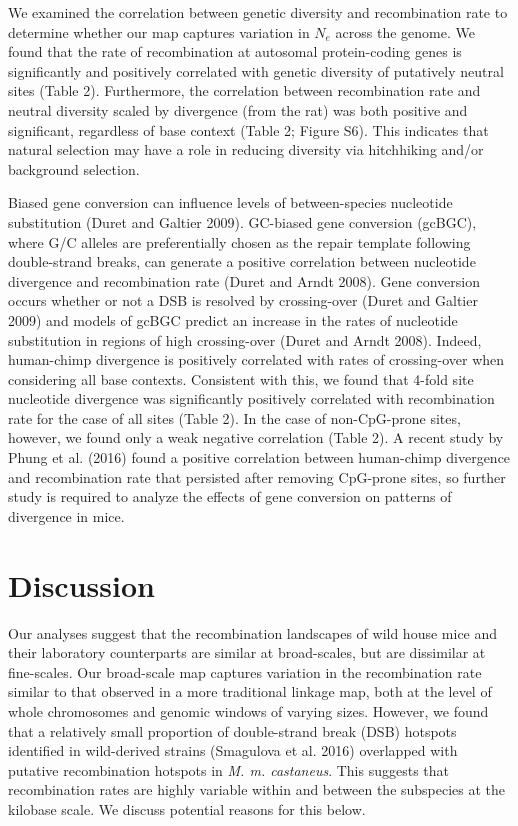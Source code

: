 	We examined the correlation between genetic diversity and recombination rate to determine whether our map captures variation in $N_e$ across the genome. We found that the rate of recombination at autosomal protein-coding genes is significantly and positively correlated with genetic diversity of putatively neutral sites (Table 2). Furthermore, the correlation between recombination rate and neutral diversity scaled by divergence (from the rat) was both positive and significant, regardless of base context (Table 2; Figure S6). This indicates that natural selection may have a role in reducing diversity via hitchhiking and/or background selection.

	Biased gene conversion can influence levels of between-species nucleotide substitution (Duret and Galtier 2009). GC-biased gene conversion (gcBGC), where G/C alleles are preferentially chosen as the repair template following double-strand breaks, can generate a positive correlation between nucleotide divergence and recombination rate (Duret and Arndt 2008). Gene conversion occurs whether or not a DSB is resolved by crossing-over (Duret and Galtier 2009) and models of gcBGC predict an increase in the rates of nucleotide substitution in regions of high crossing-over (Duret and Arndt 2008). Indeed, human-chimp divergence is positively correlated with rates of crossing-over when considering all base contexts. Consistent with this, we found that 4-fold site nucleotide divergence was significantly positively correlated with recombination rate for the case of all sites (Table 2). In the case of non-CpG-prone sites, however, we found only a weak negative correlation (Table 2). A recent study by Phung et al. (2016) found a positive correlation between human-chimp divergence and recombination rate that persisted after removing CpG-prone sites, so further study is required to analyze the effects of gene conversion on patterns of divergence in mice.

\section{Discussion}
 
	Our analyses suggest that the recombination landscapes of wild house mice and their laboratory counterparts are similar at broad-scales, but are dissimilar at fine-scales. Our broad-scale map captures variation in the recombination rate similar to that observed in a more traditional linkage map, both at the level of whole chromosomes and genomic windows of varying sizes. However, we found that a relatively small proportion of double-strand break (DSB) hotspots identified in wild-derived strains (Smagulova et al. 2016) overlapped with putative recombination hotspots in \textit{M. m. castaneus}. This suggests that recombination rates are highly variable within and between the subspecies at the kilobase scale. We discuss potential reasons for this below.
 
